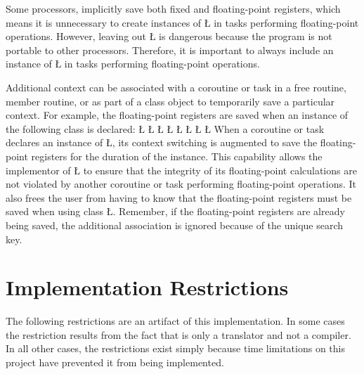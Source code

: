\documentclass[openright,twoside]{report}
\begin{document}
\begin{annotation}
 Some processors, implicitly save both fixed and floating-point registers, which means it is unnecessary to create instances of \LGinlinetrue\LGbegin\lgrinde\L{}\endlgrinde\LGend{} in tasks performing floating-point operations.
However, leaving out \LGinlinetrue\LGbegin\lgrinde\L{}\endlgrinde\LGend{} is dangerous because the program is not portable to other processors.
Therefore, it is important to always include an instance of \LGinlinetrue\LGbegin\lgrinde\L{}\endlgrinde\LGend{} in tasks performing floating-point operations.
\end{annotation}

Additional context can be associated with a coroutine or task in a free routine, member routine, or as part of a class object to temporarily save a particular context.
For example, the floating-point registers are saved when an instance of the following class is declared:
\LGinlinefalse\LGbegin\lgrinde
\L{}
\L{}
\L{\LB{}}
\L{}
\L{\LB{}}
\L{\LB{}}
\CE{}\L{\LB{}}
\L{\LB{\};}}
\endlgrinde\LGend
When a coroutine or task declares an instance of \LGinlinetrue\LGbegin\lgrinde\L{}\endlgrinde\LGend{}, its context switching is augmented to save the floating-point registers for the duration of the instance.
This capability allows the implementor of \LGinlinetrue\LGbegin\lgrinde\L{}\endlgrinde\LGend{} to ensure that the integrity of its floating-point calculations are not violated by another coroutine or task performing floating-point operations.
It also frees the user from having to know that the floating-point registers must be saved when using class \LGinlinetrue\LGbegin\lgrinde\L{}\endlgrinde\LGend{}.
Remember, if the floating-point registers are already being saved, the additional association is ignored because of the unique search key.


\section{Implementation Restrictions}
\label{s:ImplementationRestrictions}

The following restrictions are an artifact of this implementation.
In some cases the restriction results from the fact that \uC is only a translator and not a compiler.
In all other cases, the restrictions exist simply because time limitations on this project have prevented it from being implemented.
\end{document}
